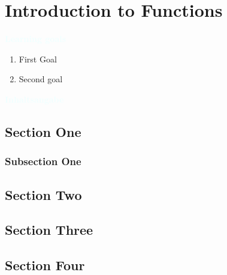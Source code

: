 \documentclass[letterpaper]{book}
\begin{document}
  \dominitoc
  \faketableofcontents

  \chapter{Introduction to Functions}
    \begin{multicols}{2}

      \begin{minipage}[t]{\linewidth}
      \textcolor{azure}{\large\bfseries Learning goals}
        \begin{enumerate}[label=\color{azure}\theenumi.]
          \item  First Goal
          \item  Second goal
        \end{enumerate}
      \end{minipage}

      \begin{minipage}[t]{\linewidth}
      \textcolor{azure}{\large\bfseries Inhaltsangabe}
        \minitoc
      \end{minipage}

    \end{multicols}

  \section{Section One}
    \subsection{Subsection One}
  \section{Section Two}
  \section{Section Three}
  \section{Section Four}
\end{document}
